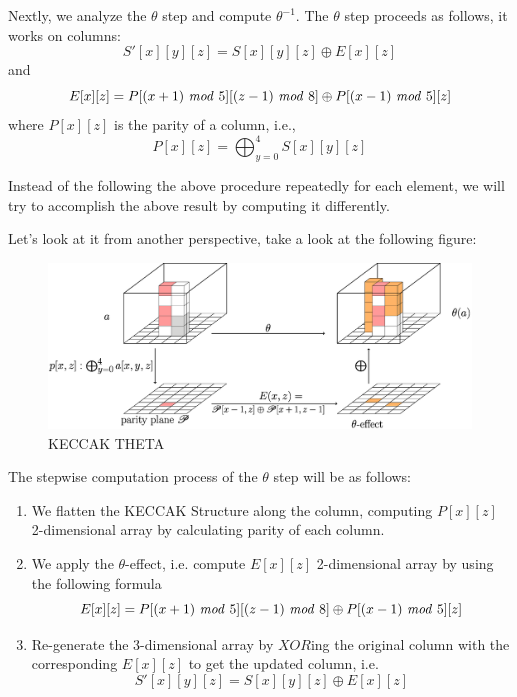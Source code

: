 \documentclass[10pt,twoside]{article}
\begin{document}
Nextly, we analyze the $\theta$ step and compute $\theta^{-1}$. \newline
The $\theta$ step proceeds as follows, it works on columns:
    \begin{equation}
      S'[x][y][z] = S[x][y][z] \oplus E[x][z] \label{th:1}
    \end{equation}
    and
    \begin{equation}
      E[x][z] = P[(x+1)\ \text{\textit{mod}}\ 5][(z-1)\ \text{\textit{mod}}\ 8] \oplus P[(x-1)\ \text{\textit{mod}}\ 5][z] \label{th:2}
    \end{equation}
    where $P[x][z]$ is the parity of a column, i.e.,
    \begin{equation}
      P[x][z] = \bigoplus_{y=0}^{4} S[x][y][z] \label{th:3}
    \end{equation}

Instead of the following the above procedure repeatedly for each element, we will try to accomplish the above result by computing it differently.

Let's look at it from another perspective, take a look at the following figure: \newline

\begin{figure}[h]
    \includegraphics[scale=0.16]{images/keccak_theta.png}
    \centering
    \caption{KECCAK THETA}
    \label{keccak-theta}
\end{figure}

The stepwise computation process of the $\theta$ step will be as follows:
\begin{enumerate}
  \setlength\itemsep{0em}
  \item We flatten the KECCAK Structure along the column, computing $P[x][z]$ 2-dimensional array by calculating parity of each column.
  \item We apply the $\theta$-effect, i.e. compute $E[x][z]$ 2-dimensional array by using the following formula
    $$E[x][z] = P[(x+1)\ \text{\textit{mod}}\ 5][(z-1)\ \text{\textit{mod}}\ 8] \oplus P[(x-1)\ \text{\textit{mod}}\ 5][z]$$
  \item Re-generate the 3-dimensional array by $XOR$ing the original column with the corresponding $E[x][z]$ to get the updated column, i.e.
    $$S'[x][y][z] = S[x][y][z] \oplus E[x][z]$$
\end{enumerate}
\end{document}
